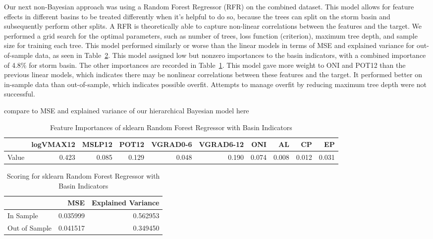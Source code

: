 \documentclass[12pt]{article}
\begin{document}
Our next non-Bayesian approach was using a Random Forest Regressor (RFR) on the combined dataset. This model allows for feature effects in different basins to be treated differently when it’s helpful to do so, because the trees can split on the storm basin and subsequently perform other splits. A RFR is theoretically able to capture non-linear correlations between the features and the target. We performed a grid search for the optimal parameters, such as number of trees, loss function (criterion), maximum tree depth, and sample size for training each tree. This model performed similarly or worse than the linear models in terms of MSE and explained variance for out-of-sample data, as seen in Table~\ref{tab:rf_scoring}. This model assigned low but nonzero importances to the basin indicators, with a combined importance of 4.8\% for storm basin. The other importances are recorded in Table~\ref{tab:rf_importances}. This model gave more weight to ONI and POT12 than the previous linear models, which indicates there may be nonlinear correlations between these features and the target. It performed better on in-sample data than out-of-sample, which indicates possible overfit. Attempts to manage overfit by reducing maximum tree depth were not successful. 

compare to MSE and explained variance of our hierarchical Bayesian model here

\begin{table}[h]
\centering
\caption{Feature Importances of sklearn Random Forest Regressor with Basin Indicators}
\label{tab:rf_importances}
\begin{tabular}{lrrrrrrrrr}
\toprule
 & logVMAX12 & MSLP12 & POT12 & VGRAD0-6 & VGRAD6-12 & ONI & AL & CP & EP \\
\midrule
Value & 0.423 & 0.085 & 0.129 & 0.048 & 0.190 & 0.074 & 0.008 & 0.012 & 0.031 \\
\bottomrule
\end{tabular}
\end{table}

\begin{table}[h]
\centering
\caption{Scoring for sklearn Random Forest Regressor with Basin Indicators}
\label{tab:rf_scoring}
\begin{tabular}{lrr}
\toprule
 & MSE & Explained Variance \\
\midrule
In Sample & 0.035999 & 0.562953 \\
Out of Sample & 0.041517 & 0.349450 \\
\bottomrule
\end{tabular}
\end{table}
\end{document}
